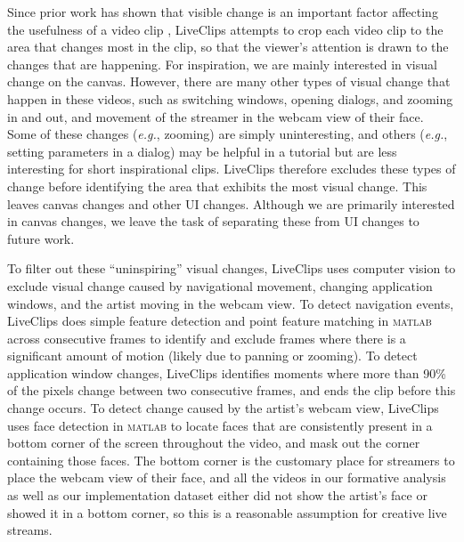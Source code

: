 Since prior work has shown that visible change is an important factor affecting the usefulness of a video clip \cite{Lafreniere2014}, LiveClips attempts to crop each video clip to the area that changes most in the clip, so that the viewer's attention is drawn to the changes that are happening. For inspiration, we are mainly interested in visual change on the canvas. However, there are many other types of visual change that happen in these videos, such as switching windows, opening dialogs, and zooming in and out, and movement of the streamer in the webcam view of their face. Some of these changes (\textit{e.g.}, zooming) are simply uninteresting, and others (\textit{e.g.}, setting parameters in a dialog) may be helpful in a tutorial but are less interesting for short inspirational clips. 
%
LiveClips therefore excludes these types of change before identifying the area that exhibits the most visual change. This leaves canvas changes and other UI changes. Although we are primarily interested in canvas changes, we leave the task of separating these from UI changes to future work.

To filter out these ``uninspiring'' visual changes, LiveClips uses computer vision to exclude visual change caused by navigational movement, changing application windows, and the artist moving in the webcam view. To detect navigation events, LiveClips does simple feature detection and point feature matching in \textsc{matlab} across consecutive frames to identify and exclude frames where there is a significant amount of motion (likely due to panning or zooming). To detect application window changes, LiveClips identifies moments where more than 90\% of the pixels change between two consecutive frames, and ends the clip before this change occurs. To detect change caused by the artist's webcam view, LiveClips uses face detection in \textsc{matlab} to locate faces that are consistently present in a bottom corner of the screen throughout the video, and mask out the corner containing those faces. The bottom corner is the customary place for streamers to place the webcam view of their face, and all the videos in our formative analysis as well as our implementation dataset either did not show the artist's face or showed it in a bottom corner, so this is a reasonable assumption for creative live streams.

